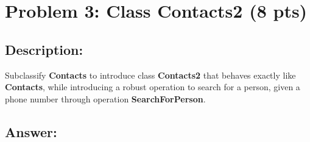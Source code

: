 \newpage
\section{Problem 3: Class Contacts2 (8 pts)}

\subsection{Description:}
Subclassify \textbf{Contacts} to introduce class \textbf{Contacts2} that behaves exactly like \textbf{Contacts},
while introducing a robust operation to search for a person, given a phone number through
operation \textbf{SearchForPerson}.

\subsection{Answer:}

